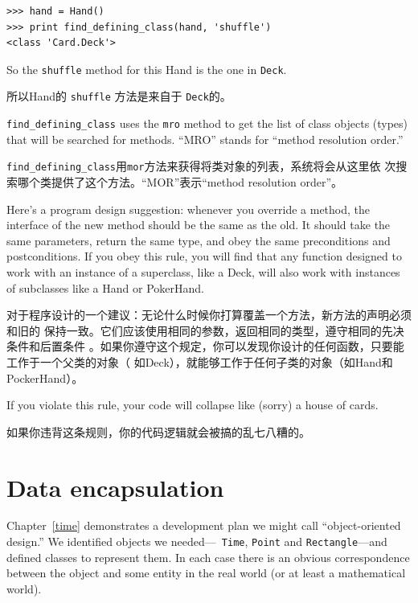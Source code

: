 \documentclass[10pt]{book}
\begin{document}
\begin{CJK}{UTF8}{gbsn}
\begin{verbatim}
>>> hand = Hand()
>>> print find_defining_class(hand, 'shuffle')
<class 'Card.Deck'>
\end{verbatim}
%
So the {\tt shuffle} method for this Hand is the one in {\tt Deck}.

所以Hand的 {\tt shuffle} 方法是来自于 {\tt Deck}的。

\verb"find_defining_class" uses the {\tt mro} method to get the list
of class objects (types) that will be searched for methods.  ``MRO''
stands for ``method resolution order.''

\verb"find_defining_class"用{\tt mor}方法来获得将类对象的列表，系统将会从这里依
次搜索哪个类提供了这个方法。``MOR''表示``method resolution order''。

Here's a program design suggestion: whenever you override a method,
the interface of the new method should be the same as the old.  It
should take the same parameters, return the same type, and obey the
same preconditions and postconditions.  If you obey this rule, you
will find that any function designed to work with an instance of a
superclass, like a Deck, will also work with instances of subclasses
like a Hand or PokerHand.

对于程序设计的一个建议：无论什么时候你打算覆盖一个方法，新方法的声明必须和旧的
保持一致。它们应该使用相同的参数，返回相同的类型，遵守相同的先决条件和后置条件
。如果你遵守这个规定，你可以发现你设计的任何函数，只要能工作于一个父类的对象（
如Deck），就能够工作于任何子类的对象（如Hand和PockerHand）。

If you violate this rule, your code will collapse like (sorry)
a house of cards.

如果你违背这条规则，你的代码逻辑就会被搞的乱七八糟的。


\section{Data encapsulation}

Chapter~\ref{time} demonstrates a development plan we might call
``object-oriented design.''  We identified objects we needed---{\tt
  Time}, {\tt Point} and {\tt Rectangle}---and defined classes to
represent them.  In each case there is an obvious correspondence
between the object and some entity in the real world (or at least a
mathematical world).


\end{CJK}
\end{document}
